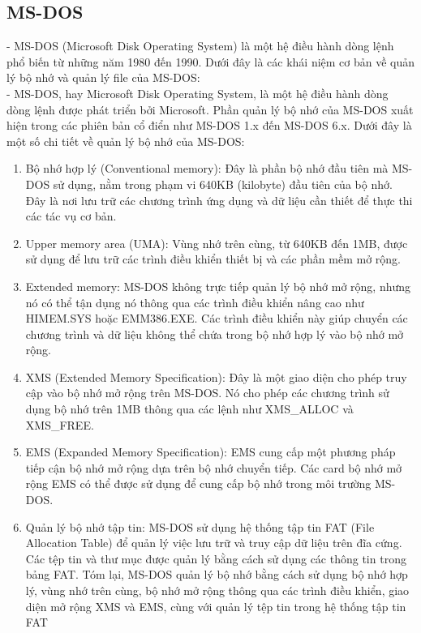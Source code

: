 \documentclass[12pt,a4paper]{article}
\begin{document}
\subsection{MS-DOS}
- MS-DOS (Microsoft Disk Operating System) là một hệ điều hành dòng lệnh phổ biến từ những năm 1980 đến 1990. Dưới đây là các khái niệm cơ bản về quản lý bộ nhớ và quản lý file của MS-DOS:\\

- MS-DOS, hay Microsoft Disk Operating System, là một hệ điều hành dòng dòng lệnh được phát triển bởi Microsoft. Phần quản lý bộ nhớ của MS-DOS xuất hiện trong các phiên bản cổ điển như MS-DOS 1.x đến MS-DOS 6.x. Dưới đây là một số chi tiết về quản lý bộ nhớ của MS-DOS:
\begin{enumerate}
	\item Bộ nhớ hợp lý (Conventional memory): Đây là phần bộ nhớ đầu tiên mà MS-DOS sử dụng, nằm trong phạm vi 640KB (kilobyte) đầu tiên của bộ nhớ. Đây là nơi lưu trữ các chương trình ứng dụng và dữ liệu cần thiết để thực thi các tác vụ cơ bản.
	\item Upper memory area (UMA): Vùng nhớ trên cùng, từ 640KB đến 1MB, được sử dụng để lưu trữ các trình điều khiển thiết bị và các phần mềm mở rộng.
	\item Extended memory: MS-DOS không trực tiếp quản lý bộ nhớ mở rộng, nhưng nó có thể tận dụng nó thông qua các trình điều khiển nâng cao như HIMEM.SYS hoặc EMM386.EXE. Các trình điều khiển này giúp chuyển các chương trình và dữ liệu không thể chứa trong bộ nhớ hợp lý vào bộ nhớ mở rộng.
	\item XMS (Extended Memory Specification): Đây là một giao diện cho phép truy cập vào bộ nhớ mở rộng trên MS-DOS. Nó cho phép các chương trình sử dụng bộ nhớ trên 1MB thông qua các lệnh như XMS\_ALLOC và XMS\_FREE.
	\item EMS (Expanded Memory Specification): EMS cung cấp một phương pháp tiếp cận bộ nhớ mở rộng dựa trên bộ nhớ chuyển tiếp. Các card bộ nhớ mở rộng EMS có thể được sử dụng để cung cấp bộ nhớ trong môi trường MS-DOS.
	\item Quản lý bộ nhớ tập tin: MS-DOS sử dụng hệ thống tập tin FAT (File Allocation Table) để quản lý việc lưu trữ và truy cập dữ liệu trên đĩa cứng. Các tệp tin và thư mục được quản lý bằng cách sử dụng các thông tin trong bảng FAT. Tóm lại, MS-DOS quản lý bộ nhớ bằng cách sử dụng bộ nhớ hợp lý, vùng nhớ trên cùng, bộ nhớ mở rộng thông qua các trình điều khiển, giao diện mở rộng XMS và EMS, cùng với quản lý tệp tin trong hệ thống tập tin FAT
\end{enumerate}
\end{document}
